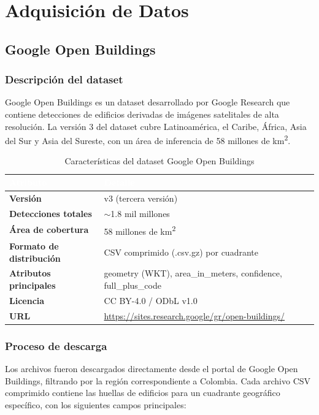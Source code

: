 \documentclass{article}
\newcommand{\tblhdr}[1]{%
  \cellcolor{azulclaro}\textbf{\textcolor{white}{#1}}%
}
\begin{document}
\section{Adquisición de Datos}

\subsection{Google Open Buildings}

\subsubsection{Descripción del dataset}

Google Open Buildings es un dataset desarrollado por Google Research que contiene detecciones de edificios derivadas de imágenes satelitales de alta resolución. La versión 3 del dataset cubre Latinoamérica, el Caribe, África, Asia del Sur y Asia del Sureste, con un área de inferencia de 58 millones de km\textsuperscript{2}.

\begin{table}[H]
\centering
\caption{Características del dataset Google Open Buildings}
\begin{tabular}{>{\bfseries}p{5cm} p{8cm}}
\toprule
\tblhdr{Atributo} & \tblhdr{Detalle} \\
\midrule
Versión           & v3 (tercera versión) \\
\rowcolor{grisfilas}
Detecciones totales & $\sim$1.8 mil millones \\
Área de cobertura & 58 millones de km\textsuperscript{2} \\
\rowcolor{grisfilas}
Formato de distribución & CSV comprimido (.csv.gz) por cuadrante \\
Atributos principales & geometry (WKT), area\_in\_meters, confidence, full\_plus\_code \\
\rowcolor{grisfilas}
Licencia          & CC BY-4.0 / ODbL v1.0 \\
URL               & \url{https://sites.research.google/gr/open-buildings/} \\
\bottomrule
\end{tabular}
\end{table}

\subsubsection{Proceso de descarga}

Los archivos fueron descargados directamente desde el portal de Google Open Buildings, filtrando por la región correspondiente a Colombia. Cada archivo CSV comprimido contiene las huellas de edificios para un cuadrante geográfico específico, con los siguientes campos principales:
\end{document}
